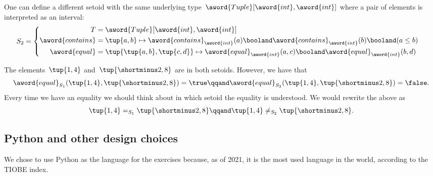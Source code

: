One can define a different setoid with the same underlying type~$\aword{Tuple}[\aword{int}, \aword{int}]$ where a pair of elements is interpreted as an interval:
\begin{equation*}
    S_2 =
    \begin{cases}
        \begin{aligned}
            T                & = \aword{Tuple}[\aword{int}, \aword{int}] \\
            \aword{contains} & = \tup{a,b} \mapsto
            \aword{contains}_{\aword{int}}(a)
            \booland
            \aword{contains}_{\aword{int}}(b)
            \booland
            (a\leq b) \\
            \aword{equal}    & = \tup{\tup{a,b}, \tup{c,d}}
            \mapsto
            \aword{equal}_{\aword{int}}(a,c)
            \booland
            \aword{equal}_{\aword{int}}(b,d)
        \end{aligned}
    \end{cases}
\end{equation*}

The elements~$\tup{1,4}$ and~$\tup{\shortminus 2, 8}$ are in both setoids.
However, we have that
\begin{equation*}
    \aword{equal}_{S_1} (\tup{1,4}, \tup{\shortminus 2, 8}) = \true
    \qqand
    \aword{equal}_{S_2} (\tup{1,4}, \tup{\shortminus 2, 8}) = \false .
\end{equation*}
Every time we have an equality we should think about in which setoid the equality is understood.
We would rewrite the above as
\begin{equation*}
    \tup{1,4} =_{S_1} \tup{ \shortminus 2, 8}
    \qqand
    \tup{1,4} \neq_{S_2} \tup{\shortminus 2, 8}.
\end{equation*}

\subsection{Python and other design choices}

We chose to use Python as the language for the exercises because, as of 2021, it is the most used language in the world, according to the TIOBE index.

